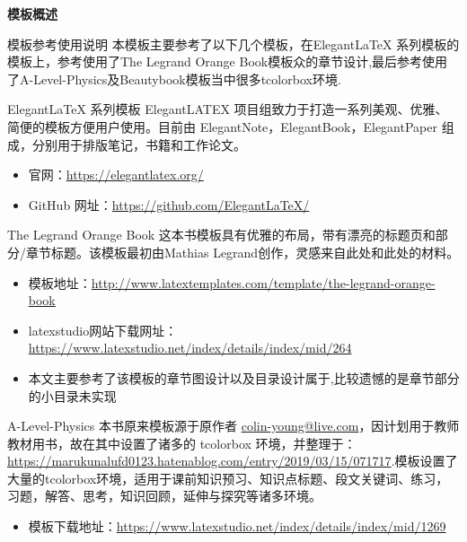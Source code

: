 
\frontmatter
\thispagestyle{empty}
\newpage
\begin{center}
	\textbf{\LARGE 模板概述}
\end{center}
\begin{ascolorbox5}{模板参考使用说明}
本模板主要参考了以下几个模板，在Elegant\LaTeX{} 系列模板的模板上，参考使用了The Legrand Orange Book模板众的章节设计,最后参考使用了A-Level-Physics及Beautybook模板当中很多tcolorbox环境.
\begin{ascboxB}{Elegant\LaTeX{} 系列模板\md{[核心版本]}}
ElegantLATEX 项目组致力于打造一系列美观、优雅、简便的模板方便用户使用。目前由
ElegantNote，ElegantBook，ElegantPaper 组成，分别用于排版笔记，书籍和工作论文。
\begin{itemize}
	\item 官网：\href{https://elegantlatex.org/}{https://elegantlatex.org/}
	\item GitHub 网址：\href{https://github.com/ElegantLaTeX/}{https://github.com/ElegantLaTeX/}
\end{itemize} 
\end{ascboxB}
\begin{ascboxB}{The Legrand Orange Book}
这本书模板具有优雅的布局，带有漂亮的标题页和部分/章节标题。该模板最初由Mathias Legrand创作，灵感来自此处和此处的材料。
\begin{itemize}
\item  模板地址：\href{http://www.latextemplates.com/template/the-legrand-orange-book}{http://www.latextemplates.com/template/the-legrand-orange-book}
\item  latexstudio网站下载网址：\href{https://www.latexstudio.net/index/details/index/mid/264}{https://www.latexstudio.net/index/details/index/mid/264}
\item 本文主要参考了该模板的章节图设计以及目录设计属于,比较遗憾的是章节部分的小目录未实现
\end{itemize} 
\end{ascboxB}
\begin{ascboxB}{A-Level-Physics}
本书原来模板源于原作者  \url{colin-young@live.com}，因计划用于教师教材用书，故在其中设置了诸多的 tcolorbox 环境，并整理于：\url{https://marukunalufd0123.hatenablog.com/entry/2019/03/15/071717}.模板设置了大量的tcolorbox环境，适用于课前知识预习、知识点标题、段文关键词、练习，习题，解答、思考，知识回顾，延伸与探究等诸多环境。
\begin{itemize}
	\item 模板下载地址：\href{https://www.latexstudio.net/index/details/index/mid/1269}{https://www.latexstudio.net/index/details/index/mid/1269}

\end{itemize}
\end{ascboxB}
\end{ascolorbox5}
